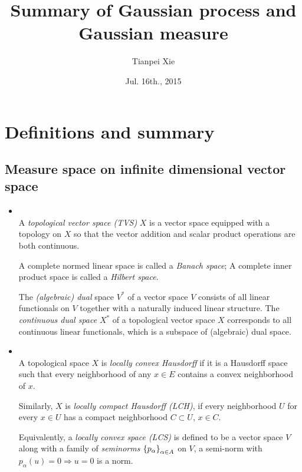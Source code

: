 \documentclass[11pt]{article}
\begin{document}
\title{Summary of Gaussian process and Gaussian measure}
\author{ Tianpei Xie}
\date{ Jul. 16th., 2015 }
\maketitle
\tableofcontents
\newpage
\section{Definitions and summary}
\subsection{Measure space on infinite dimensional vector space}
\begin{itemize}
\item  \begin{definition} \citep{taylor1958introduction}\\
A \emph{topological vector space (TVS)} $X$ is a vector space equipped with a topology  on $X$ so that the vector addition and scalar product operations are both continuous. 

A complete normed linear space is called a \emph{Banach space}; A complete inner product space is called a \emph{Hilbert space}.

The \emph{(algebraic) dual} space $V^{*}$ of a vector space $V$ consists of all linear functionals on $V$ together with a naturally induced linear structure.  The \emph{continuous dual space} $X^{*}$ of a topological vector space $X$ corresponds to all continuous linear functionals, which is a subspace of (algebraic) dual space.\\ 
\end{definition}


\item \begin{definition} \citep{schaefer1999locally}\\
A topological space $X$ is \emph{locally convex Hausdorff} if it is a Hausdorff space such that every neighborhood of any $x\in E$ contains a convex neighborhood of $x$. 

Similarly, $X$ is \emph{locally compact Hausdorff  (LCH)}, if every neighborhood $U$ for every $x\in U$ has a compact neighborhood $C\subset U$, $x\in C$. 

Equivalently, a \emph{locally convex space (LCS)}  is  defined to be a vector space $V$ along with a family of \emph{seminorms} $\left\{p_{\alpha}\right\}_{\alpha\in A}$ on $V$, a semi-norm with $p_{\alpha}(u)=0 \Rightarrow u=0$ is a norm.\\
\end{definition}


\end{itemize}
\end{document}
